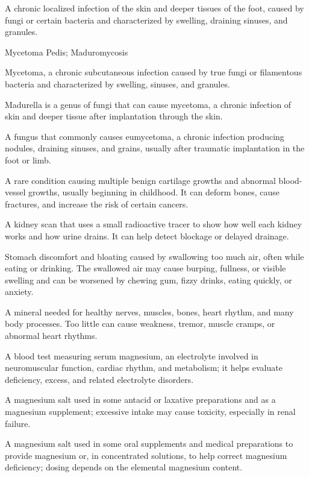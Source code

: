  A chronic localized infection of the skin and deeper tissues of the foot, caused by fungi or certain bacteria and characterized by swelling, draining sinuses, and granules.

\synonyms
Mycetoma Pedis; Maduromycosis

 Mycetoma, a chronic subcutaneous infection caused by true fungi or filamentous bacteria and characterized by swelling, sinuses, and granules.

 Madurella is a genus of fungi that can cause mycetoma, a chronic infection of skin and deeper tissue after implantation through the skin.

 A fungus that commonly causes eumycetoma, a chronic infection producing nodules, draining sinuses, and grains, usually after traumatic implantation in the foot or limb.

 A rare condition causing multiple benign cartilage growths and abnormal blood-vessel growths, usually beginning in childhood. It can deform bones, cause fractures, and increase the risk of certain cancers.

 A kidney scan that uses a small radioactive tracer to show how well each kidney works and how urine drains. It can help detect blockage or delayed drainage.

 Stomach discomfort and bloating caused by swallowing too much air, often while eating or drinking. The swallowed air may cause burping, fullness, or visible swelling and can be worsened by chewing gum, fizzy drinks, eating quickly, or anxiety.

 A mineral needed for healthy nerves, muscles, bones, heart rhythm, and many body processes. Too little can cause weakness, tremor, muscle cramps, or abnormal heart rhythms.

 A blood test measuring serum magnesium, an electrolyte involved in neuromuscular function, cardiac rhythm, and metabolism; it helps evaluate deficiency, excess, and related electrolyte disorders.

 A magnesium salt used in some antacid or laxative preparations and as a magnesium supplement; excessive intake may cause toxicity, especially in renal failure.

 A magnesium salt used in some oral supplements and medical preparations to provide magnesium or, in concentrated solutions, to help correct magnesium deficiency; dosing depends on the elemental magnesium content.

